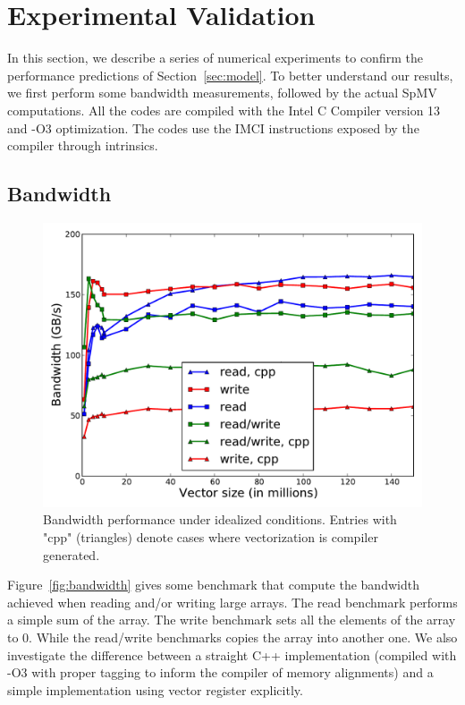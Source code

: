 \documentclass[10pt,conference,compsocconf]{IEEEtran}
\begin{document}
\section{Experimental Validation}
\label{sec:expe}
In this section, we describe a series of numerical experiments to
confirm the performance predictions of Section~\ref{sec:model}. To
better understand our results, we first perform some bandwidth
measurements, followed by the actual SpMV computations. All the codes
are compiled with the Intel C Compiler version 13 and
-O3 optimization. The codes use the IMCI instructions exposed by
the compiler through intrinsics.

\subsection{Bandwidth}


\begin{figure}[bth]
  \centering
  \includegraphics[width=.9\linewidth]{figures/bandwidth_read_write.pdf}
  
  \caption{Bandwidth performance under idealized conditions.  Entries
    with "cpp" (triangles) denote cases where vectorization is
    compiler generated.}
  \label{fig:bandwidth}
  \label{fig:band_rw_MIC}
\end{figure}

Figure~\ref{fig:bandwidth} gives some benchmark that compute the
bandwidth achieved when reading and/or writing large arrays. The read benchmark performs a
simple sum of the array. The write benchmark sets all the elements of
the array to 0. While the read/write benchmarks copies the array into
another one. We also investigate the difference between a straight C++
implementation (compiled with -O3 with proper tagging to inform the
compiler of memory alignments) and a simple implementation using
vector register explicitly.
\end{document}
